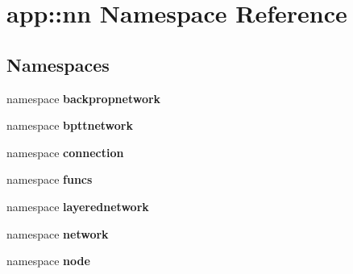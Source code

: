 \section{app::nn Namespace Reference}
\label{namespaceapp_1_1nn}


\subsection*{Namespaces}
\begin{CompactItemize}
\item 
namespace {\bf backpropnetwork}
\item 
namespace {\bf bpttnetwork}
\item 
namespace {\bf connection}
\item 
namespace {\bf funcs}
\item 
namespace {\bf layerednetwork}
\item 
namespace {\bf network}
\item 
namespace {\bf node}
\end{CompactItemize}
